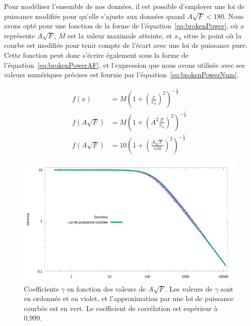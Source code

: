 	
	Pour modéliser l'ensemble de nos données, il est possible d'employer une loi de puissance modifiée pour qu'elle s'ajuste aux données quand $A\sqrt{F}<180$. Nous avons opté pour une fonction de la forme de l'équation~\ref{eq:brokenPower}, où $x$ représente $A\sqrt{F}$, $M$ est la valeur maximale atteinte, et $x_{n}$ situe le point où la courbe est modifiée pour tenir compte de l'écart avec une loi de puissance pure. Cette fonction peut donc s'écrire également sous la forme de l'équation~\ref{eq:brokenPowerAF}, et l'expression que nous avons utilisée avec ses valeurs numériques précises est fournie par l'équation~\ref{eq:brokenPowerNum}.
	
	\begin{align}
		\label{eq:brokenPower}
		f(x) &= M \left( 1 + \left( \frac{x}{x_{n}} \right)^{2} \right)^{-\frac{1}{2}} \\
		\label{eq:brokenPowerAF}
		f(A\sqrt{F}) &= M \left( 1 + \left( A^{2}\frac{F}{x_{n}} \right)^{2} \right)^{-\frac{1}{2}} \\
		\label{eq:brokenPowerNum}
		f(A\sqrt{F}) &= 10 \left( 1 + \left( \frac{A\sqrt{F}}{150} \right)^{2} \right)^{-\frac{1}{2}}
	\end{align}
	
	\begin{figure}[!htb]
		\centering
		\includegraphics[width=\textwidth]{figures/ch4/asqrtFVgammaLogLogPowerFit}
		\caption[Coefficients $\gamma$ vs. F et A, quinquies (log-log et loi de puissance)]{Coefficients $\gamma$ en fonction des valeurs de $A\sqrt{F}$. Les valeurs de $\gamma$ sont en ordonnée et en violet, et l'approximation par une loi de puissance courbée est en vert. Le coefficient de corrélation est supérieur à 0,999.}
		\label{fig:asqrtFVgammaLogLogPowerFit}
	\end{figure}
	
